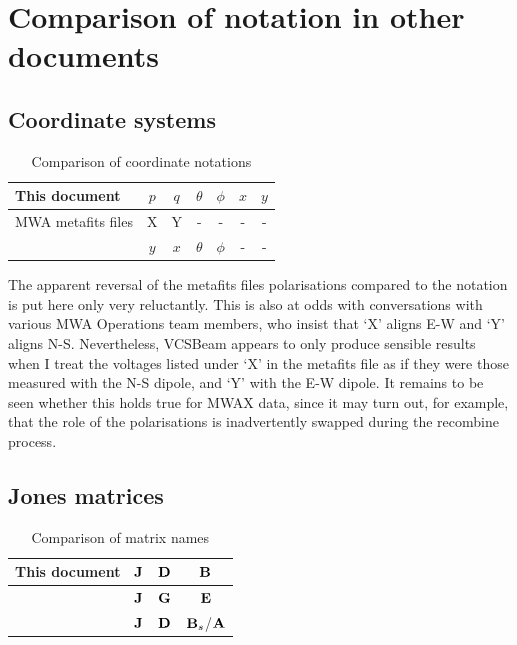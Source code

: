 \documentclass{book}
\newcommand{\vcsbeam}{{\sc VCSBeam}}
\begin{document}
\chapter{Comparison of notation in other documents}

\section{Coordinate systems}

\begin{table}[!hb]
    \centering
    \caption{Comparison of coordinate notations}
    \label{tbl:notations}
    \begin{tabular}{l|cc|cc|cc}
        This document & $p$ & $q$ & $\theta$ & $\phi$ & $x$ & $y$ \\
        \hline
        MWA metafits files       & X & Y & - & - & - & - \\
        \citet{Sokolowski2017} & $y$ & $x$ & $\theta$ & $\phi$ & - & - \\
    \end{tabular}
\end{table}

The apparent reversal of the metafits files polarisations compared to the \citet{Sokolowski2017} notation is put here only very reluctantly.
This is also at odds with conversations with various MWA Operations team members, who insist that `X' aligns E-W and `Y' aligns N-S.
Nevertheless, \vcsbeam{} appears to only produce sensible results when I treat the voltages listed under `X' in the metafits file as if they were those measured with the N-S dipole, and `Y' with the E-W dipole.
It remains to be seen whether this holds true for MWAX data, since it may turn out, for example, that the role of the polarisations is inadvertently swapped during the recombine process.

\section{Jones matrices}

\begin{table}[!hb]
    \centering
    \caption{Comparison of matrix names}
    \label{tbl:notations}
    \begin{tabular}{l|ccc}
        This document & ${\bf J}$ & ${\bf D}$ & ${\bf B}$ \\
        \hline
        \citet{Sokolowski2017} & ${\bf J}$ & ${\bf G}$ & ${\bf E}$ \\
        \citet{Ord2019} & ${\bf J}$ & ${\bf D}$ & ${\bf B}_s$/${\bf A}$ \\
    \end{tabular}
\end{table}

\printindex


\end{document}
